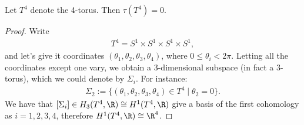 \documentclass[11pt]{book}
\begin{document}
\begin{example} Let $T^4$ denote the 4-torus. Then $\tau(T^4) = 0$.
\end{example}
\begin{proof} Write
\begin{align*}
    T^4 = S^1 \times S^1 \times S^1 \times S^1,
\end{align*}
and let's give it coordinates $(\theta_1,\theta_2,\theta_3,\theta_4)$, where $0 \le \theta_i < 2\pi$. Letting all the coordinates except one vary, we obtain a 3-dimensional subspace (in fact a 3-torus), which we could denote by $\Sigma_i$. For instance:
\begin{align*}
    \Sigma_2 := \{(\theta_1,\theta_2,\theta_3,\theta_4)\in T^4 \mid \theta_2 =  0\}.
\end{align*}
We have that $[\Sigma_i]\in H_3(T^4,\R) \cong H^1(T^4,\R)$ give a basis of the first cohomology as $i=1,2,3,4$, therefore $H^1(T^4,\R)\cong \R^4$.


\end{proof}
\end{document}

